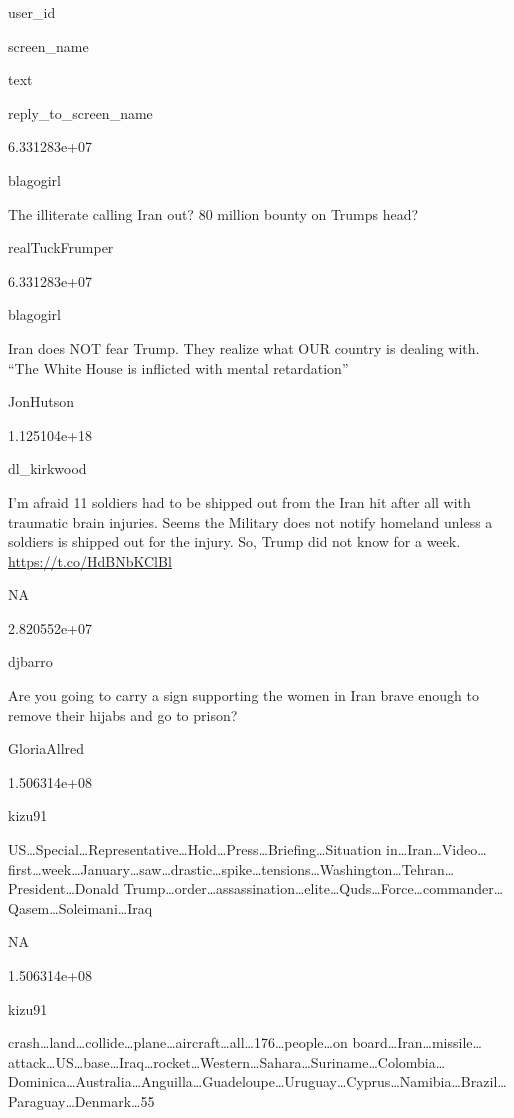 \documentclass[
]{book}
\begin{document}
user\_id

screen\_name

text

reply\_to\_screen\_name

6.331283e+07

blagogirl

\citet{realTuckFrumper} The illiterate calling Iran out?
80 million bounty on Trumps head?

realTuckFrumper

6.331283e+07

blagogirl

\citet{JonHutson} Iran does NOT fear Trump.
They realize what OUR country is dealing with.
``The White House is inflicted with mental retardation''

JonHutson

1.125104e+18

dl\_kirkwood

I'm afraid 11 soldiers had to be shipped out from the Iran hit after all with traumatic brain injuries. Seems the Military does not notify homeland unless a soldiers is shipped out for the injury. So, Trump did not know for a week. \url{https://t.co/HdBNbKClBl}

NA

2.820552e+07

djbarro

\citet{GloriaAllred} Are you going to carry a sign supporting the women in Iran brave enough to remove their hijabs and go to prison?

GloriaAllred

1.506314e+08

kizu91

US\ldots Special\ldots Representative\ldots Hold\ldots Press\ldots Briefing\ldots Situation in\ldots Iran\ldots Video\ldots first\ldots week\ldots January\ldots saw\ldots drastic\ldots spike\ldots tensions\ldots Washington\ldots Tehran\ldots President\ldots Donald Trump\ldots order\ldots assassination\ldots elite\ldots Quds\ldots Force\ldots commander\ldots Qasem\ldots Soleimani\ldots Iraq

NA

1.506314e+08

kizu91

crash\ldots land\ldots collide\ldots plane\ldots aircraft\ldots all\ldots176\ldots people\ldots on board\ldots Iran\ldots missile\ldots attack\ldots US\ldots base\ldots Iraq\ldots rocket\ldots Western\ldots Sahara\ldots Suriname\ldots Colombia\ldots Dominica\ldots Australia\ldots Anguilla\ldots Guadeloupe\ldots Uruguay\ldots Cyprus\ldots Namibia\ldots Brazil\ldots Paraguay\ldots Denmark\ldots55
\end{document}
